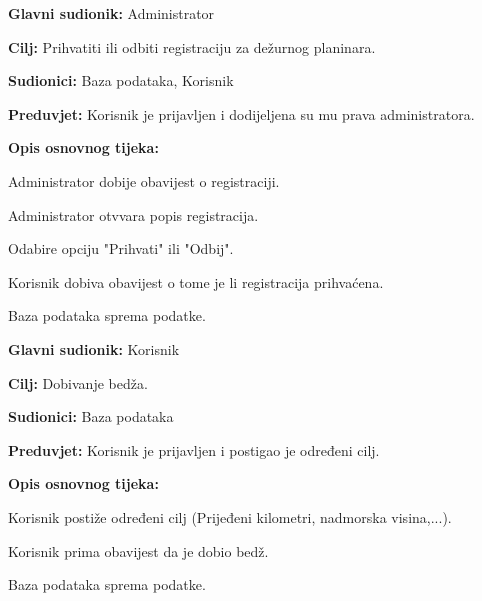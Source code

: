 		
		\noindent {}
		\begin{packed_item}
			
			\item \textbf{Glavni sudionik: } Administrator
			\item  \textbf{Cilj:} Prihvatiti ili odbiti registraciju za dežurnog planinara.
			\item  \textbf{Sudionici:} Baza podataka, Korisnik
			\item  \textbf{Preduvjet:} Korisnik je prijavljen i dodijeljena su mu prava administratora.
			\item  \textbf{Opis osnovnog tijeka:}
			
			\item[] \begin{packed_enum}
				
				\item Administrator dobije obavijest o registraciji.
				\item Administrator otvvara popis registracija.
				\item Odabire opciju "Prihvati" ili "Odbij".
				\item Korisnik dobiva obavijest o tome je li registracija prihvaćena.
				\item Baza podataka sprema podatke.
				
			\end{packed_enum}
		\end{packed_item}
		
		
		
		\noindent \underbar{\textbf{UC15 - Dobivanje bedža}}
		\begin{packed_item}
			
			\item \textbf{Glavni sudionik: } Korisnik
			\item  \textbf{Cilj:} Dobivanje bedža.
			\item  \textbf{Sudionici:} Baza podataka
			\item  \textbf{Preduvjet:} Korisnik je prijavljen i postigao je određeni cilj.
			\item  \textbf{Opis osnovnog tijeka:}
			
			\item[] \begin{packed_enum}
				
				\item Korisnik postiže određeni cilj (Prijeđeni kilometri, nadmorska visina,...).
				\item Korisnik prima obavijest da je dobio bedž.
				\item Baza podataka sprema podatke.
				
			\end{packed_enum}
		\end{packed_item}

